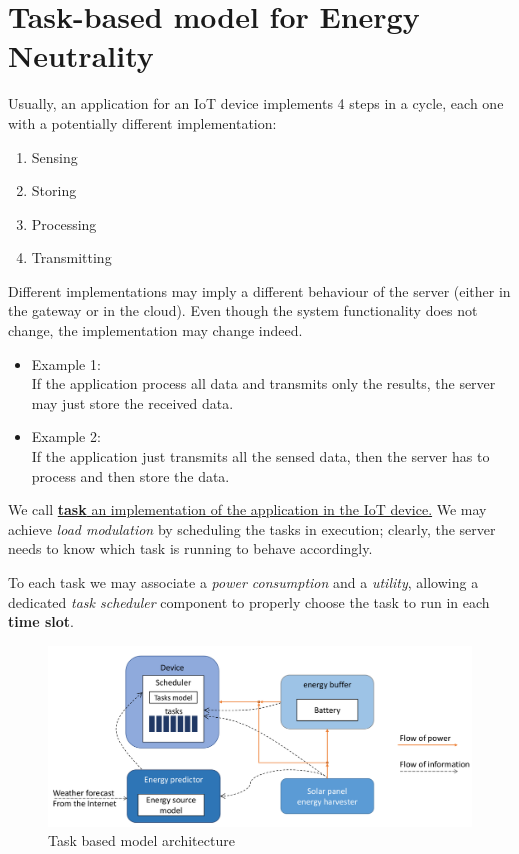 \section{Task-based model for Energy Neutrality}
Usually, an application for an IoT device implements 4 steps in a cycle, each one with a potentially different implementation:
\begin{enumerate}
   \item Sensing
   \item Storing
   \item Processing
   \item Transmitting
\end{enumerate}

Different implementations may imply a different
behaviour of the server (either in the gateway or in the
cloud).
Even though the system functionality does not change, the implementation may change indeed.
\begin{itemize}
   \item 
   Example 1:\\
   If the application process all data and transmits only the
   results, the server may just store the received data.
   \item Example 2:\\
   If the application just transmits all the sensed data, then the server has to process and then store the
   data.
\end{itemize}

\newpage
\begin{paracol}{2}


   We call \ul{\textbf{task} an implementation of the application in the IoT device.}
   We may achieve \textit{load modulation} by scheduling the tasks in execution; clearly, the server needs to know which task is running to behave accordingly.
   
   To each task we may associate a \textit{power consumption} and a \textit{utility}, allowing a dedicated \textit{task scheduler} component to properly choose the task to run in each \textbf{time slot}.
   
   \switchcolumn
   \begin{figure}[htbp]
      \centering
      \includegraphics{images/taskmodel.png}
      \caption{Task based model architecture}
      \label{fig:taskmodel}
   \end{figure}
\end{paracol}

